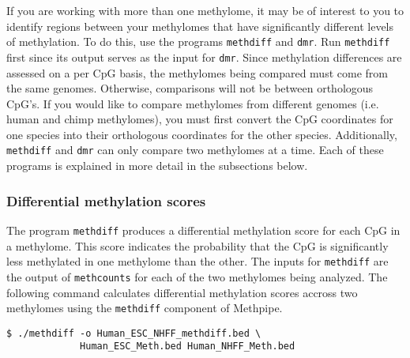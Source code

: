 \documentclass[10pt]{article}
\newcommand{\prog}[1]{\texttt{#1}}
\begin{document}
If you are working with more than one methylome, it may be of interest
to you to identify regions between your methylomes that have
significantly different levels of methylation. To do this, use the
programs \prog{methdiff} and \prog{dmr}. Run \prog{methdiff}
first since its output serves as the input for \prog{dmr}. Since
methylation differences are assessed on a per CpG basis, the
methylomes being compared must come from the same genomes. Otherwise,
comparisons will not be between orthologous CpG's. If you would like
to compare methylomes from different genomes (i.e. human and chimp
methylomes), you must first convert the CpG coordinates for one
species into their orthologous coordinates for the other
species. Additionally, \prog{methdiff} and \prog{dmr} can only
compare two methylomes at a time. Each of these programs is explained
in more detail in the subsections below.

\subsubsection{Differential methylation scores}
\label{sec:methdiff}

The program \prog{methdiff} produces a differential methylation score
for each CpG in a methylome. This score indicates the probability that
the CpG is significantly less methylated in one methylome than the
other. The inputs for \prog{methdiff} are the output of
\prog{methcounts} for each of the two methylomes being analyzed. The
following command calculates differential methylation scores accross
two methylomes using the \prog{methdiff} component of Methpipe.
\begin{verbatim}
$ ./methdiff -o Human_ESC_NHFF_methdiff.bed \
             Human_ESC_Meth.bed Human_NHFF_Meth.bed
\end{verbatim}


\end{document}
